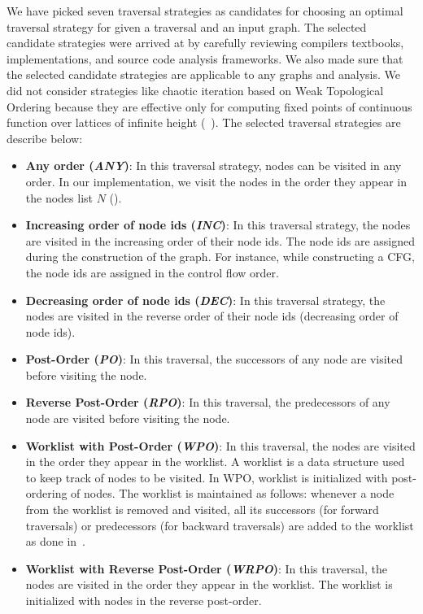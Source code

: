 We have picked seven traversal strategies as candidates for choosing an optimal
traversal strategy for given a traversal and an input graph. The selected candidate strategies were arrived at by carefully reviewing compilers textbooks, implementations, and source code analysis frameworks. We also made sure that the selected candidate strategies are applicable to any graphs and analysis. We did not consider strategies like chaotic iteration based on Weak Topological Ordering because they are effective only for computing fixed points of continuous function over lattices of infinite height (~\cite{bourdoncle93}).
The selected traversal strategies are describe below:
\begin{itemize}
  \item \textbf{Any order (\textit{ANY})}: In this traversal strategy, nodes can
  be visited in any order. In our implementation, we visit the nodes in the
  order they appear in the nodes list $N$ ().
  \item \textbf{Increasing order of node ids (\textit{INC})}: In this traversal
  strategy, the nodes are visited in the increasing order of their node ids. The
  node ids are assigned during the construction of the graph. For instance, while
  constructing a CFG, the node ids are assigned in the control flow order. 
%   
  \item \textbf{Decreasing order of node ids (\textit{DEC})}: In this traversal
  strategy, the nodes are visited in the reverse order of their node ids
  (decreasing order of node ids).
  \item \textbf{Post-Order (\textit{PO})}: In this traversal, the successors of
  any node are visited before visiting the node.
  \item \textbf{Reverse Post-Order (\textit{RPO})}: In this traversal, the
  predecessors of any node are visited before visiting the node.
  \item \textbf{Worklist with Post-Order (\textit{WPO})}: In this traversal, the
  nodes are visited in the order they appear in the worklist. A worklist is a
  data structure used to keep track of nodes to be visited. In WPO, worklist is
  initialized with post-ordering of nodes. The worklist is maintained as
  follows: whenever a node from the worklist is removed and visited, all its
  successors (for forward traversals) or predecessors (for backward traversals)
  are added to the worklist as done in~\cite{atkinson2001implementation}.
  \item \textbf{Worklist with Reverse Post-Order (\textit{WRPO})}: In this
  traversal, the nodes are visited in the order they appear in the worklist. The
  worklist is initialized with nodes in the reverse post-order.
\end{itemize}

